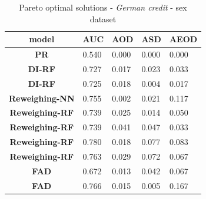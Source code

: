 \documentclass[preprint,12pt]{elsarticle}
\begin{document}
\begin{table}
	\centering
	\caption{Pareto optimal solutions - \textit{German credit} - sex dataset}
	\begin{tabular}{|c|l|l|l|l|}
		\hline
		\textbf{model}         & \multicolumn{1}{c|}{\textbf{AUC}} & \multicolumn{1}{c|}{\textbf{AOD}} & \multicolumn{1}{c|}{\textbf{ASD}} & \multicolumn{1}{c|}{\textbf{AEOD}} \\ \hline
		\textbf{PR}            & 0.540                             & 0.000                             & 0.000                             & 0.000                              \\ \hline
		\textbf{DI-RF}         & 0.727                             & 0.017                             & 0.023                             & 0.033                              \\ \hline
		\textbf{DI-RF}         & 0.725                             & 0.018                             & 0.004                             & 0.017                              \\ \hline
		\textbf{Reweighing-NN} & 0.755                             & 0.002                             & 0.021                             & 0.117                              \\ \hline
		\textbf{Reweighing-RF} & 0.739                             & 0.025                             & 0.014                             & 0.050                              \\ \hline
		\textbf{Reweighing-RF} & 0.739                             & 0.041                             & 0.047                             & 0.033                              \\ \hline
		\textbf{Reweighing-RF} & 0.780                             & 0.018                             & 0.077                             & 0.083                              \\ \hline
		\textbf{Reweighing-RF} & 0.763                             & 0.029                             & 0.072                             & 0.067                              \\ \hline
		\textbf{FAD}           & 0.672                             & 0.013                             & 0.042                             & 0.067                              \\ \hline
		\textbf{FAD}           & 0.766                             & 0.015                             & 0.005                             & 0.167                              \\ \hline

\end{tabular}
\end{table}
\end{document}
